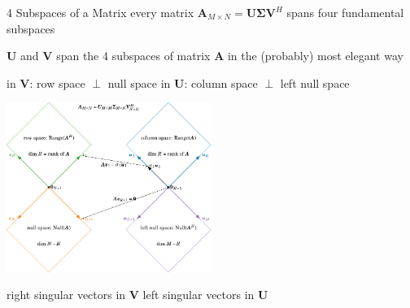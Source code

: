 \documentclass[mathserif, aspectratio=1610]{intbeamer}
\begin{document}
\begin{frame}{4 Subspaces of a Matrix}
%
every matrix $\bm{A}_{M \times N} = \bm{U} \bm{\Sigma} \bm{V}^H$ spans four fundamental subspaces

$\bm{U}$ and $\bm{V}$ span the 4 subspaces of matrix $\bm{A}$ in the (probably) most elegant way

\hspace{0.75cm}
in $\bm{V}$: \textcolor{C2}{row space} $\perp$ \textcolor{C1}{null space}
\hspace{2cm}
in $\bm{U}$: \textcolor{C0}{column space} $\perp$ \textcolor{C4}{left null space}

\centering
\includegraphics[width=0.5\textwidth]{four_subspaces.pdf}

\hspace{0.75cm}
right singular vectors in $\bm{V}$
\hspace{4.5cm}
left singular vectors in $\bm{U}$

\end{frame}
\end{document}
